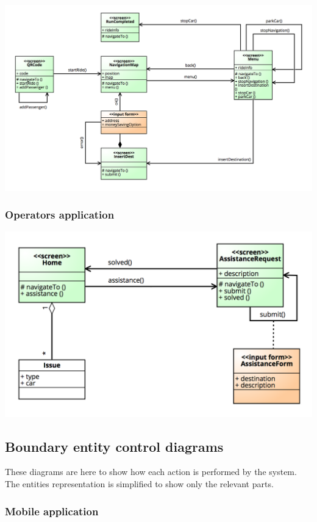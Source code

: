 \documentclass[]{article}
\begin{document}
\centerline{\includegraphics{./images/UX_Car.png}}

\subsubsection{Operators application}\label{operators-application}

\centerline{\includegraphics{./images/UX_Operator.png}}

\subsection{Boundary entity control
diagrams}\label{boundary-entity-control-diagrams}

These diagrams are here to show how each action is performed by the
system. The entities representation is simplified to show only the
relevant parts.

\subsubsection{Mobile application}\label{mobile-application-2}
\end{document}
